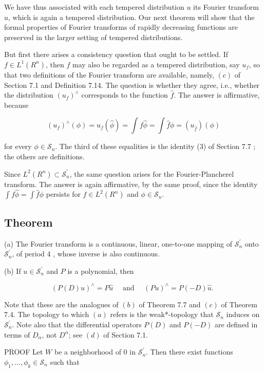 \documentclass[10pt]{article}
\begin{document}
We have thus associated with each tempered distribution $u$ its Fourier transform $\hat{u}$, which is again a tempered distribution. Our next theorem will show that the formal
properties of Fourier transforms of rapidly decreasing functions are preserved in the larger setting of tempered distributions.

But first there arises a consistency question that ought to be settled. If $f \in L^{1}\left(R^{n}\right)$, then $f$ may also be regarded as a tempered distribution, say $u_{f}$, so that two definitions of the Fourier transform are available, namely, $(c)$ of Section 7.1 and Definition 7.14. The question is whether they agree, i.e., whether the distribution $\left(u_{f}\right)^{\wedge}$ corresponds to the function $\hat{f}$. The answer is affirmative, because

$$
\left(u_{f}\right)^{\wedge}(\phi)=u_{f}(\hat{\phi})=\int f \hat{\phi}=\int \hat{f} \phi=\left(u_{\hat{f}}\right)(\phi)
$$

for every $\phi \in \mathscr{S}_{n}$. The third of these equalities is the identity (3) of Section 7.7 ; the others are definitions.

Since $L^{2}\left(R^{n}\right) \subset \mathscr{S}_{n}^{\prime}$, the same question arises for the Fourier-Plancherel transform. The answer is again affirmative, by the same proof, since the identity $\int f \hat{\phi}=\int \hat{f} \phi$ persists for $f \in L^{2}\left(R^{n}\right)$ and $\phi \in \mathscr{S}_{n}$.

\subsection{Theorem}
(a) The Fourier transform is a continuous, linear, one-to-one mapping of $\mathscr{S}_{n}^{\prime}$ onto $\mathscr{S}_{n}^{\prime}$, of period 4 , whose inverse is also continuous.

(b) If $u \in \mathscr{S}_{n}^{\prime}$ and $P$ is a polynomial, then

$$
(P(D) u)^{\wedge}=P \hat{u} \quad \text { and } \quad(P u)^{\wedge}=P(-D) \hat{u} \text {. }
$$

Note that these are the analogues of $(b)$ of Theorem 7.7 and $(c)$ of Theorem 7.4. The topology to which $(a)$ refers is the weak*-topology that $\mathscr{S}_{n}$ induces on $\mathscr{S}_{n}^{\prime}$. Note also that the differential operators $P(D)$ and $P(-D)$ are defined in terms of $D_{\alpha}$, not $D^{\alpha}$; see $(d)$ of Section 7.1.

PROOF Let $W$ be a neighborhood of 0 in $\mathscr{S}_{n}^{\prime}$. Then there exist functions $\phi_{1}, \ldots, \phi_{k} \in \mathscr{S}_{n}$ such that
\end{document}
